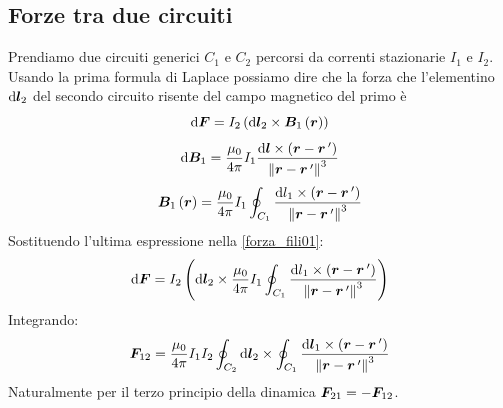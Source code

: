 \subsection{Forze tra due circuiti}
Prendiamo due circuiti generici $C_1$ e $C_2$ percorsi da correnti stazionarie $I_1$ e $I_2$. Usando la prima formula di Laplace possiamo dire che la forza che l'elementino $\mathrm{d}\boldsymbol{l}_2$ del secondo circuito risente del campo magnetico del primo è 
\begin{equation}
\label{forza_fili01}
\mathrm{d}\boldsymbol{F}=I_2\left(\mathrm{d}\boldsymbol{l}_2\times\boldsymbol{B}_1\left(\boldsymbol{r}\right)\right)
\end{equation}
\begin{equation}
\mathrm{d} \boldsymbol{B}_1=\frac{\mu_0}{4\pi}I_1\frac{\mathrm{d}\boldsymbol{l}\times\left(\boldsymbol{r}-\boldsymbol{r}\,'\right)}{\left\lVert\boldsymbol{r}-\boldsymbol{r}\,'\right\rVert^3}
\end{equation}
\begin{equation}
\boldsymbol{B}_1\left(\boldsymbol{r}\right)=\frac{\mu_0}{4\pi}I_1\oint_{C_1}\frac{\mathrm{d} l_1\times\left(\boldsymbol{r}-\boldsymbol{r}\,'\right)}{\left\lVert\boldsymbol{r}-\boldsymbol{r}\,'\right\rVert^3}
\end{equation}
Sostituendo l'ultima espressione nella \eqref{forza_fili01}:
\begin{equation}
\mathrm{d} \boldsymbol{F}=I_2\left(\mathrm{d}\boldsymbol{l}_2\times\frac{\mu_0}{4\pi}I_1\oint_{C_1}\frac{\mathrm{d} l_1\times\left(\boldsymbol{r}-\boldsymbol{r}\,'\right)}{\left\lVert\boldsymbol{r}-\boldsymbol{r}\,'\right\rVert^3}\right)
\end{equation}
Integrando:
\begin{equation}
\boldsymbol{F}_{12}=\frac{\mu_0}{4\pi}I_1I_2\oint_{C_2}\mathrm{d} \boldsymbol{l}_2\times\oint_{C_1}\frac{\mathrm{d} \boldsymbol{l}_1\times\left(\boldsymbol{r}-\boldsymbol{r}\,'\right)}{\left\lVert\boldsymbol{r}-\boldsymbol{r}\,'\right\rVert^3}
\end{equation}
Naturalmente per il terzo principio della dinamica $\boldsymbol{F}_{21}=-\boldsymbol{F}_{12}$.
